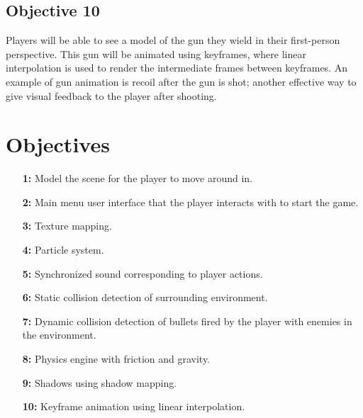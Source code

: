 \documentclass {article}
\begin{document}
\subsection{Objective 10}
Players will be able to see a model of the gun they wield in their first-person perspective. This gun will be animated using keyframes, where linear interpolation is used to render the intermediate frames between keyframes. An example of gun animation is recoil after the gun is shot; another effective way to give visual feedback to the player after shooting.


\newpage
\section{Objectives}\label{sec:objectives}
\begin{enumerate}
    \item[\textbf{1:}]
    Model the scene for the player to move around in.

    \item[\textbf{2:}]
    Main menu user interface that the player interacts with to start the game.

    \item[\textbf{3:}]
    Texture mapping.

    \item[\textbf{4:}]
    Particle system.

    \item[\textbf{5:}]
    Synchronized sound corresponding to player actions.

    \item[\textbf{6:}]
    Static collision detection of surrounding environment.

    \item[\textbf{7:}]
    Dynamic collision detection of bullets fired by the player with enemies in the environment.

    \item[\textbf{8:}]
    Physics engine with friction and gravity.

    \item[\textbf{9:}]
    Shadows using shadow mapping.

    \item[\textbf{10:}]
    Keyframe animation using linear interpolation.
\end{enumerate}

\newpage
\printbibliography[heading=bibintoc, title={References}] %
\end{document}
